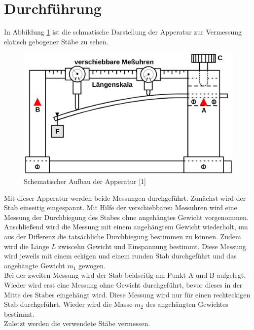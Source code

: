 \section{Durchführung}
\label{sec:Durchführung}

In Abbildung \ref{fig:abb2} ist die schmatische Darstellung der Apperatur zur 
Vermessung elatisch gebogener Stäbe zu sehen. 

\begin{figure}
    \centering
    \includegraphics[scale=0.2]{content/aufbau.png}
    \caption{Schematischer Aufbau der Apperatur [1]}
    \label{fig:abb2}
\end{figure}

Mit dieser Apperatur werden beide Messungen durchgeführt. Zunächst wird
der Stab einseitig eingespannt. Mit Hilfe der verschiebbaren Messuhren 
wird eine Messung der Durchbiegung des Stabes ohne angehängtes Gewicht 
vorgenommen. Anschließend wird die Messung mit einem angehängtem 
Gewicht wiederholt, um aus der Differenz die tatsächliche Durchbiegung
bestimmen zu können. Zudem wird die Länge $L$ zwiscehn Gewicht und 
Einspannung bestimmt. Diese Messung wird jeweils mit einem eckigen und 
einem runden Stab durchgeführt und das angehängte Gewicht $m_1$ gewogen.
\\
Bei der zweiten Messung wird der Stab beidseitig am Punkt A und B 
aufgelegt. Wieder wird erst eine Messung ohne Gewicht durchgeführt, 
bevor dieses in der Mitte des Stabes eingehängt wird. Diese 
Messung wird nur für einen rechteckigen Stab durchgeführt. Wieder 
wird die Masse $m_2$ des angehängten Gewichtes bestimmt. 
\\
Zuletzt werden die verwendete Stäbe vermessen. 

